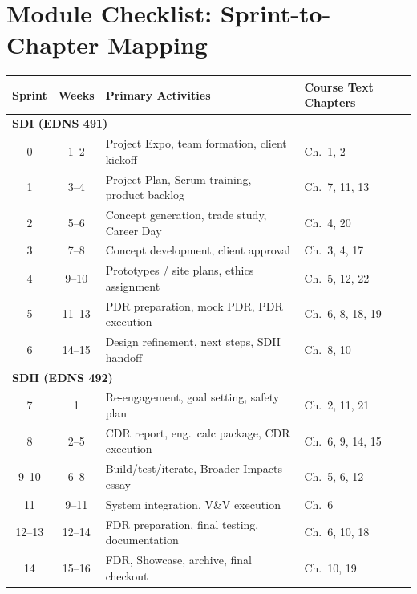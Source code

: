 \section{Module Checklist: Sprint-to-Chapter Mapping}

{\centering\small
\begin{longtable}{c c >{\raggedright\arraybackslash}p{5.2cm} >{\raggedright\arraybackslash}p{3.8cm}}
\toprule
\textbf{Sprint} & \textbf{Weeks} & \textbf{Primary Activities} & \textbf{Course Text Chapters} \\
\midrule
\endhead
\multicolumn{4}{l}{\textbf{SDI (EDNS 491)}} \\
\midrule
0 & 1--2 & Project Expo, team formation, client kickoff & Ch.~1, 2 \\
1 & 3--4 & Project Plan, Scrum training, product backlog & Ch.~7, 11, 13 \\
2 & 5--6 & Concept generation, trade study, Career Day & Ch.~4, 20 \\
3 & 7--8 & Concept development, client approval & Ch.~3, 4, 17 \\
4 & 9--10 & Prototypes / site plans, ethics assignment & Ch.~5, 12, 22 \\
5 & 11--13 & PDR preparation, mock PDR, PDR execution & Ch.~6, 8, 18, 19 \\
6 & 14--15 & Design refinement, next steps, SDII handoff & Ch.~8, 10 \\
\midrule
\multicolumn{4}{l}{\textbf{SDII (EDNS 492)}} \\
\midrule
7 & 1 & Re-engagement, goal setting, safety plan & Ch.~2, 11, 21 \\
8 & 2--5 & CDR report, eng.\ calc package, CDR execution & Ch.~6, 9, 14, 15 \\
9--10 & 6--8 & Build/test/iterate, Broader Impacts essay & Ch.~5, 6, 12 \\
11 & 9--11 & System integration, V\&V execution & Ch.~6 \\
12--13 & 12--14 & FDR preparation, final testing, documentation & Ch.~6, 10, 18 \\
14 & 15--16 & FDR, Showcase, archive, final checkout & Ch.~10, 19 \\
\bottomrule
\end{longtable}
}

